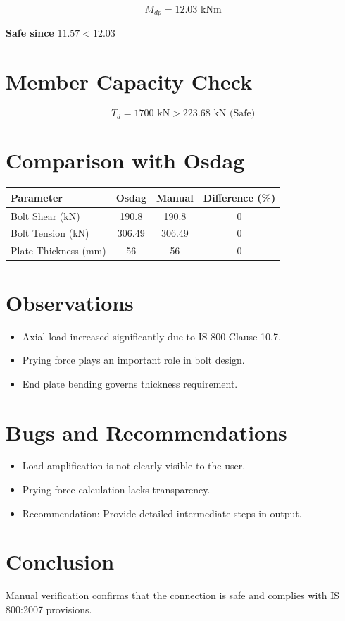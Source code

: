 \begin{equation}
M_{dp} = 12.03 \text{ kNm}
\end{equation}

\textbf{Safe since } $11.57 < 12.03$

\section{Member Capacity Check}

\begin{equation}
T_d = 1700 \text{ kN} > 223.68 \text{ kN (Safe)}
\end{equation}

\section{Comparison with Osdag}

\begin{center}
\begin{tabular}{lccc}
\toprule
Parameter & Osdag & Manual & Difference (\%) \\
\midrule
Bolt Shear (kN) & 190.8 & 190.8 & 0 \\
Bolt Tension (kN) & 306.49 & 306.49 & 0 \\
Plate Thickness (mm) & 56 & 56 & 0 \\
\bottomrule
\end{tabular}
\end{center}

\section{Observations}
\begin{itemize}
    \item Axial load increased significantly due to IS 800 Clause 10.7.
    \item Prying force plays an important role in bolt design.
    \item End plate bending governs thickness requirement.
\end{itemize}

\section{Bugs and Recommendations}
\begin{itemize}
    \item Load amplification is not clearly visible to the user.
    \item Prying force calculation lacks transparency.
    \item Recommendation: Provide detailed intermediate steps in output.
\end{itemize}

\section{Conclusion}
Manual verification confirms that the connection is safe and complies with IS 800:2007 provisions.

